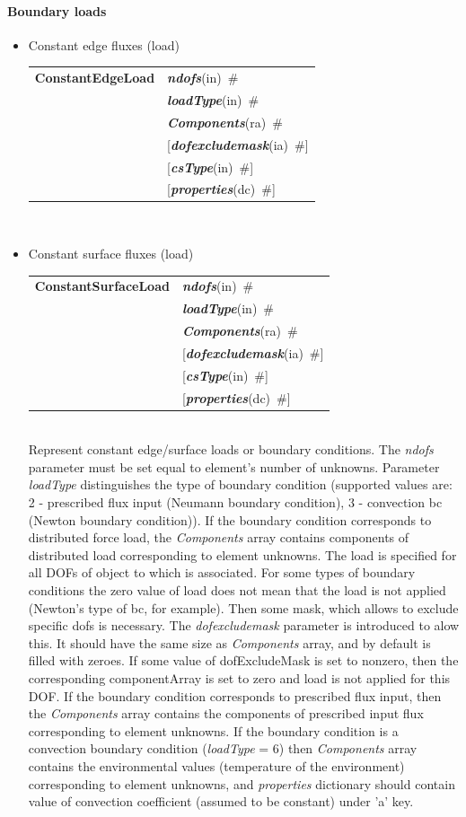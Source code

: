 \documentclass[a4paper]{article}
\makeatletter
\newcommand{\param}[1]{{\em #1}}
\newcommand{\keywordnotype}[1]{\mbox{{\it{\bf{#1}}}}}
\newcommand{\keyword}[2]{\mbox{{\keywordnotype{#1}\tiny (#2)}}}
\newcommand{\entKeywordInst}[1]{\mbox{{\bf{{#1}}}}}
\newcommand{\field}[2]{\mbox{\keyword{#1}{#2}~\#}}
\newcommand{\optField}[2]{\mbox{[\field{#1}{#2}]}}
\newenvironment{record}[1][]{\begin{tabular}{|ll}}{\end{tabular}\\}
\newcommand{\recentry}[2]{{#1}&{#2}\\}
\newcounter{rcc}
\newenvironment{record}[1][\textwidth]{\setcounter{rcc}{0}\begin{tabular*}{#1}{|ll@{\extracolsep{\fill}}r}}{\end{tabular*}\\}
\newcommand{\recentry}[2]{\ifthenelse{\value{rcc}>0}{&$\backslash$ \\}{\setcounter{rcc}{1}}{#1}&{#2}}
\makeatother
\begin{document}
\paragraph{Boundary loads}
\begin{itemize}
\item Constant edge fluxes (load)

  \begin{record}[0.9\textwidth]
    \recentry{\entKeywordInst{ConstantEdgeLoad}}{\field{ndofs}{in}} \recentry{}{\field{loadType}{in}}
    \recentry{}{\field{Components}{ra}} \recentry{}{\optField{dofexcludemask}{ia}}
    \recentry{}{\optField{csType}{in}} \recentry{}{\optField{properties}{dc}}
  \end{record}
\item Constant surface fluxes (load)

  \begin{record}[0.9\textwidth]
    \recentry{\entKeywordInst{ConstantSurfaceLoad}}{\field{ndofs}{in}} \recentry{}{\field{loadType}{in}}
    \recentry{}{\field{Components}{ra}} \recentry{}{\optField{dofexcludemask}{ia}}
    \recentry{}{\optField{csType}{in}} \recentry{}{\optField{properties}{dc}}
  \end{record}
Represent constant edge/surface loads or boundary conditions. The \param{ndofs} parameter must be set
equal to element's number of unknowns. Parameter \param{loadType}
distinguishes the type of boundary condition (supported values are:
2 - prescribed flux input (Neumann boundary condition), 3 - convection bc (Newton boundary condition)).
If the boundary condition corresponds to distributed force load, the
\param{Components} array contains components of distributed load
corresponding to element unknowns.
The load is specified for all DOFs of object to which is associated.
For some types of boundary conditions the zero value of load does not mean
that the load is not applied (Newton's type of bc, for example). Then
some mask, which allows to exclude specific dofs is necessary.
The \param{dofexcludemask} parameter is introduced to alow this.
It should have the same size as \param{Components} array, and by
default is filled with zeroes. If some value of dofExcludeMask is set
to nonzero, then the corresponding componentArray
is set to zero and load is not applied for this DOF.
If the boundary condition corresponds to prescribed flux input, then
the \param{Components} array contains the components of prescribed
input flux corresponding to element unknowns.
If the boundary condition is a convection boundary condition
(\param{loadType} = 6) then \param{Components} array contains the
environmental values (temperature of the environment) corresponding to
element unknowns, and \param{properties} dictionary should contain
value of convection coefficient (assumed to be constant) under 'a'
key.



\end{itemize}
\end{document}
